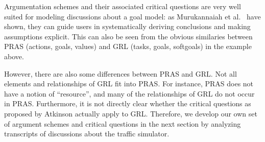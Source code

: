Argumentation schemes and their associated critical questions are very well suited for modeling discussions about a goal model: as Murukannaiah et al.~\cite{murukannaiah2015} have shown, they can guide users in systematically deriving conclusions and making assumptions explicit. This can also be seen from the obvious similaries between PRAS (actions, goals, values) and GRL (tasks, goals, softgoals) in the example above.

However, there are also some differences between PRAS and GRL. Not all elements and relationships of GRL fit into PRAS. For instance, PRAS does not have a notion of ``resource'', and many of the relationships of GRL do not occur in PRAS. Furthermore, it is not directly clear whether the critical questions as proposed by Atkinson actually apply to GRL. Therefore, we develop our own set of argument schemes and critical questions in the next section by analyzing transcripts of discussions about the traffic simulator.